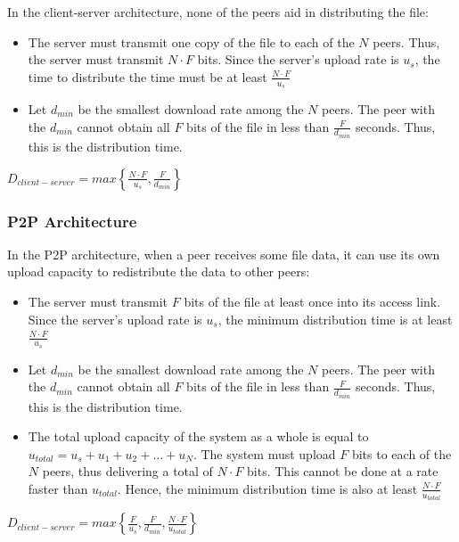 \documentclass[12pt]{article}
\begin{document}
In the client-server architecture, none of the peers aid in distributing the file:

\begin{itemize}
    \item The server must transmit one copy of the file to each of the $N$ peers. Thus, the server must transmit $N\cdot F$ bits. Since the server's upload rate is $u_s$, the time to distribute the time must be at least $\displaystyle\frac{N\cdot F}{u_s}$
    \item Let $d_{min}$ be the smallest download rate among the $N$ peers. The peer with the $d_{min}$ cannot obtain all $F$ bits of the file in less than $\displaystyle\frac{F}{d_{min}}$ seconds. Thus, this is the distribution time. 
\end{itemize}

\begin{center}
    $\displaystyle D_{client-server}=
    max\left\{\frac{N\cdot F}{u_s},\frac{F}{d_{min}}\right\}$
\end{center}

\subsubsection{P2P Architecture}

In the P2P architecture, when a peer receives some file data, it can use its own upload capacity to redistribute the data to other peers:

\begin{itemize}
    \item The server must transmit $F$ bits of the file at least once into its access link. Since the server's upload rate is $u_s$, the minimum distribution time is at least $\displaystyle\frac{N\cdot F}{u_s}$
    \item Let $d_{min}$ be the smallest download rate among the $N$ peers. The peer with the $d_{min}$ cannot obtain all $F$ bits of the file in less than $\displaystyle\frac{F}{d_{min}}$ seconds. Thus, this is the distribution time.
    \item The total upload capacity of the system as a whole is equal to $u_{total} = u_s + u_1 + u_2+...+u_N$. The system must upload $F$ bits to each of the $N$ peers, thus delivering a total of $N\cdot F$ bits. This cannot be done at a rate faster than $u_{total}$. Hence, the minimum distribution time is also at least
    $\displaystyle\frac{N\cdot F}{u_{total}}$
\end{itemize}

\begin{center}
    $\displaystyle D_{client-server}=
    max\left\{\frac{F}{u_s},\frac{F}{d_{min}},\frac{N\cdot F}{u_{total}}\right\}$
\end{center}
\end{document}
